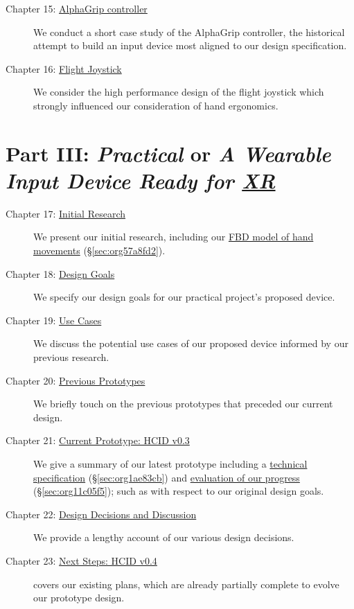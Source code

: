 \documentclass[logo,bsc,singlespacing,parskip]{infthesis}
\begin{document}
\begin{description}
\item[{Chapter 15: \hyperref[sec:org1b6f9a0]{AlphaGrip controller}}] We  conduct a short case study of the AlphaGrip controller, the historical attempt to build  an input device most aligned to our design specification.

\item[{Chapter 16: \hyperref[sec:org69f16d7]{Flight Joystick}}] We consider the high performance design of the flight joystick which strongly influenced our consideration of hand ergonomics.
\end{description}

\section*{Part III: \emph{Practical} or \emph{A Wearable Input Device Ready for \hyperref[org39cbd51]{XR}}}
\label{sec:orgbe32ec4}
\begin{description}
\item[{Chapter 17: \hyperref[sec:orge0c8edf]{Initial Research}}] We present our initial research, including our \hyperref[sec:org57a8fd2]{FBD model of hand movements} (\S \ref{sec:org57a8fd2}).

\item[{Chapter 18: \hyperref[sec:orgf250acb]{Design Goals}}] We specify our design goals for our practical project's proposed device.

\item[{Chapter 19:  \hyperref[sec:org2d37584]{Use Cases}}] We discuss the potential use cases of our proposed  device  informed by our previous research.

\item[{Chapter 20: \hyperref[sec:org07d55de]{Previous Prototypes}}] We briefly touch on the previous prototypes that preceded our current design.

\item[{Chapter 21: \hyperref[sec:org25f7bc2]{Current Prototype: HCID v0.3}}] We give a summary of our latest prototype including a \hyperref[sec:org1ae83cb]{technical specification} (\S \ref{sec:org1ae83cb}) and \hyperref[sec:org11c05f5]{evaluation of our progress} (\S \ref{sec:org11c05f5}); such as with respect to our original design goals.

\item[{Chapter 22: \hyperref[sec:org70f081f]{Design Decisions and Discussion}}] We provide a lengthy account of our various design decisions.

\item[{Chapter 23:  \hyperref[sec:orgf0596d4]{Next Steps: HCID v0.4}}] covers our existing plans, which are already partially complete to evolve our prototype design.
\end{description}
\end{document}
